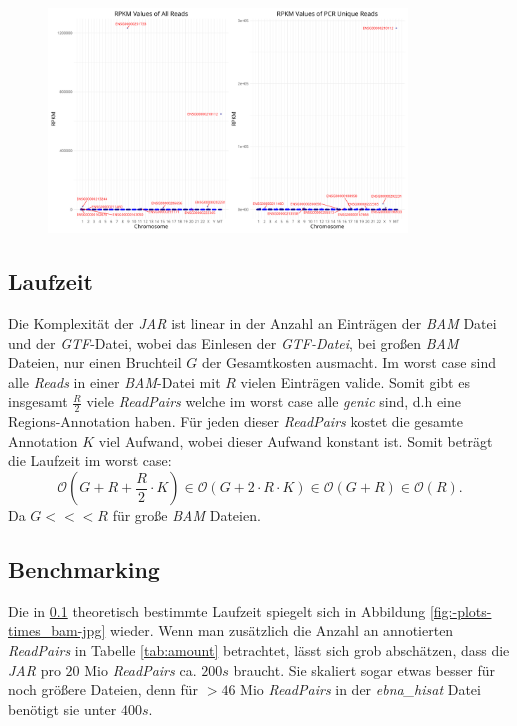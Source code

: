 \documentclass[12pt]{article}
\begin{document}
\begin{figure}[htpb]
    \centering
    \includegraphics[width=0.85\textwidth]{./plots/hes_star/Plots/rpkm_mplot.png}
    \caption{}
    \label{fig:-plots-hes_star-Plots-rpkm_mplot-png}
\end{figure}

\subsection{Laufzeit}\label{sec:laufzeit}
Die Komplexität der \textit{JAR} ist linear in der Anzahl an Einträgen der \textit{BAM} Datei und der \textit{GTF}-Datei,
wobei das Einlesen der \textit{GTF-Datei}, bei gro\ss en \textit{BAM} Dateien,  nur einen Bruchteil $G$ der Gesamtkosten ausmacht.
Im worst case sind alle \textit{Reads} in einer \textit{BAM}-Datei mit $R$ vielen Einträgen valide. Somit gibt es insgesamt 
$\frac{R}{2}$ viele \textit{ReadPairs} welche im worst case alle \textit{genic} sind, d.h eine Regions-Annotation haben.
Für jeden dieser \textit{ReadPairs} kostet die gesamte Annotation $K$ viel Aufwand, wobei dieser Aufwand konstant ist.
Somit beträgt die Laufzeit im worst case:
\[
    \mathcal{O}(G + R + \frac{R}{2} \cdot K) \in \mathcal{O}(G + 2 \cdot R \cdot K) \in \mathcal{O}(G+R) \in \mathcal{O}(R)
.\]
Da $G <<< R$ für gro\ss e \textit{BAM} Dateien.
\subsection{Benchmarking}
Die in \ref{sec:laufzeit} theoretisch bestimmte Laufzeit spiegelt sich in Abbildung \ref{fig:-plots-times_bam-jpg} wieder.
Wenn man zusätzlich die Anzahl an annotierten \textit{ReadPairs} in Tabelle \ref{tab:amount} betrachtet, lässt sich grob 
abschätzen, dass die \textit{JAR} pro $20$ Mio \textit{ReadPairs} ca. $200s$ braucht. Sie skaliert sogar etwas besser
für noch grö\ss ere Dateien, denn für $>46$ Mio \textit{ReadPairs} in der \textit{ebna\_hisat} Datei benötigt sie 
unter $400s$.
\end{document}
